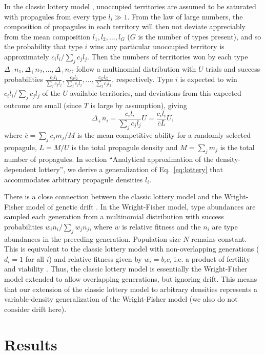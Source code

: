 \documentclass[11pt]{article}
\begin{document}
In the classic lottery model \citep{chesson_1981}, unoccupied territories are assumed to be saturated with propagules from every type $l_i\gg 1$. From the law of large numbers, the composition of propagules in each territory will then not deviate appreciably from the mean composition $l_1,l_2,\ldots,l_G$ ($G$ is the number of types present), and so the probability that type $i$ wins any particular unoccupied territory is approximately $c_i l_i/\sum_j c_j l_j$. Then the numbers of territories won by each type $\Delta_+ n_1,\Delta_+ n_2,\ldots,\Delta_+ n_G$ follow a multinomial distribution with $U$ trials and success probabilities $\frac{c_1 l_1}{\sum_j c_j l_j},\frac{c_2 l_2}{\sum_j c_j l_j},\ldots,\frac{c_G l_G}{\sum_j c_j l_j}$, respectively. Type $i$ is expected to win $c_i l_i/\sum_j c_j l_j$ of the $U$ available territories, and deviations from this expected outcome are small (since $T$ is large by assumption), giving 
\begin{equation}
\Delta_+ n_i=\frac{c_i l_i}{\sum_j c_j l_j}U=\frac{c_i l_i}{\overline{c}L}U, \label{eq:lottery}
\end{equation}
where $\overline{c}=\sum_j c_j m_j/M$ is the mean competitive ability for a randomly selected propagule, $L=M/U$ is the total propagule density and $M=\sum_j m_j$ is the total number of propagules. In section ``Analytical approximation of the density-dependent lottery'', we derive a generalization of Eq.~\eqref{eq:lottery} that accommodates arbitrary propagule densities $l_i$.
 
There is a close connection between the classic lottery model and the Wright-Fisher model of genetic drift \citep{svardal_2015}. In the Wright-Fisher model, type abundances are sampled each generation from a multinomial distribution with success probabilities $w_i n_i/\sum_j w_j n_j$, where $w$ is relative fitness and the $n_i$ are  type abundances in the preceding generation. Population size $N$ remains constant. This is equivalent to the classic lottery model with non-overlapping generations ($d_i=1$ for all $i$) and relative fitness given by $w_i=b_i c_i$ i.e. a product of fertility and viability \citep[pp. 185]{crow_1970}. Thus, the classic lottery model is essentially the Wright-Fisher model extended to allow overlapping generations, but ignoring drift. This means that our extension of the classic lottery model to arbitrary densities represents a variable-density generalization of the Wright-Fisher model (we also do not consider drift here).

\section*{Results}
\end{document}
